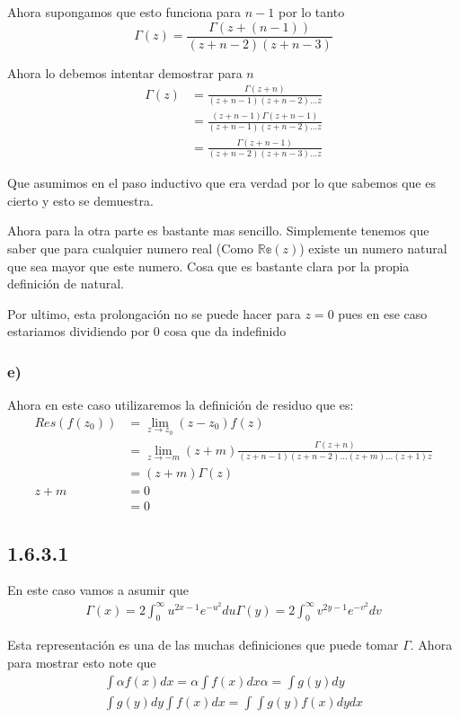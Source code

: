 \documentclass[12pt]{exam}
\begin{document}
Ahora supongamos que esto funciona para $n - 1$ por lo tanto
$$
\Gamma(z) = \frac{\Gamma(z + (n - 1))}{(z + n - 2)(z + n - 3)}
$$

Ahora lo debemos intentar demostrar para $n$
\begin{align*}
  \Gamma(z) &= \frac{\Gamma(z + n)}{(z + n - 1)(z + n - 2)\ldots z}\\
  &= \frac{(z + n - 1)\Gamma(z + n - 1)}{(z + n - 1)(z + n - 2)\ldots z}\\
  &= \frac{\Gamma(z + n - 1)}{(z + n - 2)(z + n - 3)\ldots  z}
\end{align*}

Que asumimos en el paso inductivo que era verdad por lo que sabemos que es cierto y esto se demuestra.

Ahora para la otra parte es bastante mas sencillo. Simplemente tenemos que saber que para cualquier numero real (Como $\mathbb{Re}(z)$) existe un numero natural que sea mayor que este numero. Cosa que es bastante clara por la propia definición de natural.

Por ultimo, esta prolongación no se puede hacer para $z = 0$ pues en ese caso estariamos dividiendo por $0$ cosa que da indefinido

\subsubsection*{e)}

Ahora en este caso utilizaremos la definición de residuo que es:
\begin{align*}
  Res(f(z_0)) &= \lim_{z \to z_0} (z - z_0) f(z)\\
  &= \lim_{z \to -m} (z + m) \frac{\Gamma(z + n)}{(z + n - 1)(z + n - 2)\ldots(z + m)\ldots(z + 1)z}\\
  &= (z + m)\Gamma(z)\\
  z + m &= 0\\
  &= 0
\end{align*}

\subsection*{1.6.3.1}

En este caso vamos a asumir que 
\begin{align*}
  \Gamma(x) = 2\int_0^\infty u^{2x - 1} e^{-u^2} du
  \Gamma(y) = 2\int_0^\infty v^{2y - 1} e^{-v^2} dv
\end{align*}

Esta representación es una de las muchas definiciones que puede tomar $\Gamma$. Ahora para mostrar esto note que 
\begin{align*}
  \int \alpha f(x)dx = \alpha \int f(x) dx
  \alpha = \int g(y) dy \\
  \int g(y) dy \int f(x) dx = \int \int g(y) f(x) dy dx
\end{align*}
\end{document}
